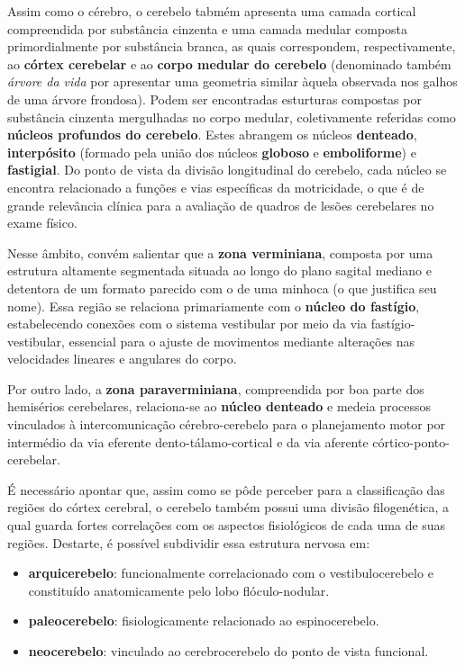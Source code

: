 \documentclass[
]{book}
\providecommand{\tightlist}{%
  \setlength{\itemsep}{0pt}\setlength{\parskip}{0pt}}
\begin{document}
Assim como o cérebro, o cerebelo tabmém apresenta uma camada cortical compreendida por substância cinzenta e uma camada medular composta primordialmente por substância branca, as quais correspondem, respectivamente, ao \textbf{córtex cerebelar} e ao \textbf{corpo medular do cerebelo} (denominado também \emph{árvore da vida} por apresentar uma geometria similar àquela observada nos galhos de uma árvore frondosa). Podem ser encontradas esturturas compostas por substância cinzenta mergulhadas no corpo medular, coletivamente referidas como \textbf{núcleos profundos do cerebelo}. Estes abrangem os núcleos \textbf{denteado}, \textbf{interpósito} (formado pela união dos núcleos \textbf{globoso} e \textbf{emboliforme}) e \textbf{fastigial}. Do ponto de vista da divisão longitudinal do cerebelo, cada núcleo se encontra relacionado a funções e vias específicas da motricidade, o que é de grande relevância clínica para a avaliação de quadros de lesões cerebelares no exame físico.

Nesse âmbito, convém salientar que a \textbf{zona verminiana}, composta por uma estrutura altamente segmentada situada ao longo do plano sagital mediano e detentora de um formato parecido com o de uma minhoca (o que justifica seu nome). Essa região se relaciona primariamente com o \textbf{núcleo do fastígio}, estabelecendo conexões com o sistema vestibular por meio da via fastígio-vestibular, essencial para o ajuste de movimentos mediante alterações nas velocidades lineares e angulares do corpo.

Por outro lado, a \textbf{zona paraverminiana}, compreendida por boa parte dos hemisérios cerebelares, relaciona-se ao \textbf{núcleo denteado} e medeia processos vinculados à intercomunicação cérebro-cerebelo para o planejamento motor por intermédio da via eferente dento-tálamo-cortical e da via aferente córtico-ponto-cerebelar.

É necessário apontar que, assim como se pôde perceber para a classificação das regiões do córtex cerebral, o cerebelo também possui uma divisão filogenética, a qual guarda fortes correlações com os aspectos fisiológicos de cada uma de suas regiões. Destarte, é possível subdividir essa estrutura nervosa em:

\begin{itemize}
\tightlist
\item
  \textbf{arquicerebelo}: funcionalmente correlacionado com o vestibulocerebelo e constituído anatomicamente pelo lobo flóculo-nodular.
\item
  \textbf{paleocerebelo}: fisiologicamente relacionado ao espinocerebelo.
\item
  \textbf{neocerebelo}: vinculado ao cerebrocerebelo do ponto de vista funcional.
\end{itemize}
\end{document}
